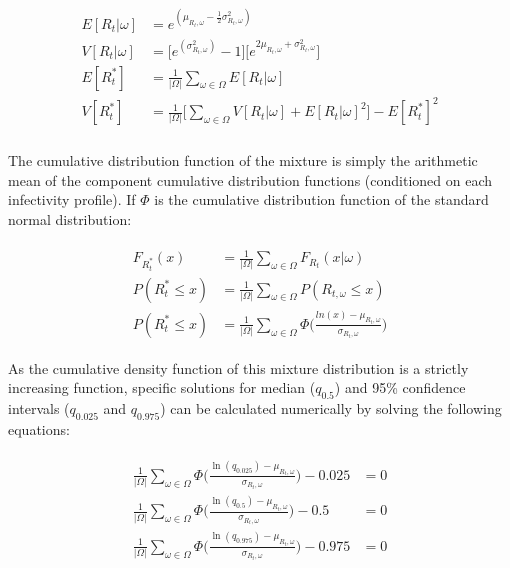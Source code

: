 \documentclass[10pt,letterpaper]{article}
\begin{document}
\begin{eqnarray}
\label{eq:final_2}
\begin{aligned}
E[R_t|\omega] &= e^{(\mu_{R_t,\omega} - \frac{1}{2}\sigma_{R_t,\omega}^2)} \\
V[R_t|\omega] &= \big[e^{(\sigma_{R_t,\omega}^2)} - 1\big] \big[e^{2 \mu_{R_t,\omega} + \sigma_{R_t,\omega}^2}\big] \\
E[R_t^*] &= \frac{1}{|\Omega|}\sum_{\omega \in \Omega} E[{R_t|\omega}] \\
V[R_t^*] &= \frac{1}{|\Omega|} \bigg[\sum_{\omega \in \Omega}{V[R_t|\omega]+E[R_t|\omega]^2}\bigg] - E[R_t^*]^2 \\
\end{aligned}
\end{eqnarray}

The cumulative distribution function of the mixture is simply the arithmetic mean of the component cumulative distribution functions (conditioned on each infectivity profile). If $\Phi$ is the cumulative distribution function of the standard normal distribution:

\begin{eqnarray}
\label{eq:final_3}
\begin{aligned}
F_{R_t^*}(x) &= \frac{1}{|\Omega|}\sum_{\omega \in \Omega}F_{R_t}(x|\omega) \\
P(R_t^* \le x) &= \frac{1}{|\Omega|}\sum_{\omega \in \Omega} P(R_{t,\omega} \le x) \\
P(R_t^* \le x) &= \frac{1}{|\Omega|}\sum_{\omega \in \Omega} \Phi\bigg(\frac{ln(x) - \mu_{R_t,\omega}}{\sigma_{R_t,\omega}}\bigg)
\end{aligned}
\end{eqnarray}

As the cumulative density function of this mixture distribution is a strictly increasing function, specific solutions for median ($q_{0.5}$) and 95\% confidence intervals ($q_{0.025}$ and $q_{0.975}$) can be calculated numerically by solving the following equations:

\begin{eqnarray}
\label{eq:final_4}
\begin{aligned}
\frac{1}{|\Omega|}\sum_{\omega \in \Omega} \Phi\bigg(\frac{\ln(q_{0.025}) - \mu_{R_t,\omega}}{\sigma_{R_t,\omega}}\bigg) - 0.025 &= 0 \\
\frac{1}{|\Omega|}\sum_{\omega \in \Omega} \Phi\bigg(\frac{\ln(q_{0.5}) - \mu_{R_t,\omega}}{\sigma_{R_t,\omega}}\bigg) - 0.5 &= 0 \\
\frac{1}{|\Omega|}\sum_{\omega \in \Omega} \Phi\bigg(\frac{\ln(q_{0.975}) - \mu_{R_t,\omega}}{\sigma_{R_t,\omega}}\bigg) - 0.975 &= 0
\end{aligned}
\end{eqnarray}
\end{document}
